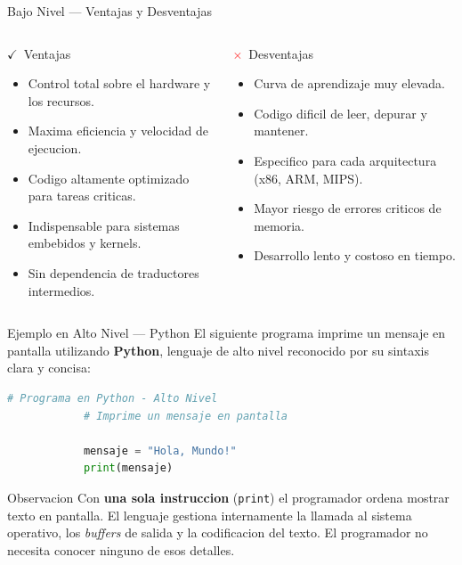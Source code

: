 \documentclass[10pt, aspectratio=169]{beamer}
\begin{document}
	\begin{frame}{Bajo Nivel --- Ventajas y Desventajas}
		\begin{columns}
			\begin{block}{\textcolor{unemiNaranja}{$\checkmark$}\ Ventajas}
				\begin{itemize}
					\item Control total sobre el hardware y los recursos.
					\item Maxima eficiencia y velocidad de ejecucion.
					\item Codigo altamente optimizado para tareas criticas.
					\item Indispensable para sistemas embebidos y kernels.
					\item Sin dependencia de traductores intermedios.
				\end{itemize}
			\end{block}
			\begin{block}{\textcolor{red}{$\times$}\ Desventajas}
				\begin{itemize}
					\item Curva de aprendizaje muy elevada.
					\item Codigo dificil de leer, depurar y mantener.
					\item Especifico para cada arquitectura (x86, ARM, MIPS).
					\item Mayor riesgo de errores criticos de memoria.
					\item Desarrollo lento y costoso en tiempo.
				\end{itemize}
			\end{block}
		\end{columns}
	\end{frame}
	
	\begin{frame}[fragile]{Ejemplo en Alto Nivel --- Python}
		El siguiente programa imprime un mensaje en pantalla utilizando \textbf{Python},
		lenguaje de alto nivel reconocido por su sintaxis clara y concisa:
		\vspace{0.3cm}
		\begin{lstlisting}[language=Python]
			# Programa en Python - Alto Nivel
			# Imprime un mensaje en pantalla
			
			mensaje = "Hola, Mundo!"
			print(mensaje)
		\end{lstlisting}
		\vspace{0.3cm}
		\begin{block}{Observacion}
			Con \textbf{una sola instruccion} (\texttt{print}) el programador ordena mostrar
			texto en pantalla. El lenguaje gestiona internamente la llamada al sistema
			operativo, los \textit{buffers} de salida y la codificacion del texto.
			El programador no necesita conocer ninguno de esos detalles.
		\end{block}
	\end{frame}
	
\end{document}
